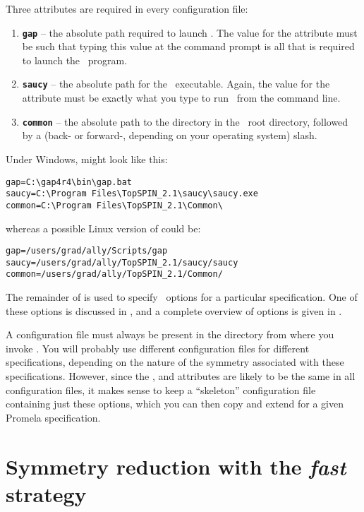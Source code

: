 \noindent Three attributes are required in every configuration file:

\vspace{2mm}
\begin{enumerate}
\item {\bf \texttt{gap}} -- the absolute path required to launch \gap.  The value for
the  attribute must be such that typing this value at
the command prompt is all that is required to launch the \gap\
program.
\item {\bf \texttt{saucy}}  -- the absolute path for the \saucy\ executable.  Again, the
value for the \inline{saucy} attribute must be exactly what you type
to run \saucy\ from the command line.
\item {\bf \texttt{common}} -- the absolute path to the  directory in
the \topspin\ root directory, followed by a (back- or forward-,
depending on your operating system) slash.
\end{enumerate}
%
Under Windows,  might look like this:
%
\begin{lstlisting}
gap=C:\gap4r4\bin\gap.bat
saucy=C:\Program Files\TopSPIN_2.1\saucy\saucy.exe
common=C:\Program Files\TopSPIN_2.1\Common\
\end{lstlisting}
%
whereas a possible Linux version of  could be:
%
\begin{lstlisting}
gap=/users/grad/ally/Scripts/gap
saucy=/users/grad/ally/TopSPIN_2.1/saucy/saucy
common=/users/grad/ally/TopSPIN_2.1/Common/
\end{lstlisting}
%
The remainder of  is used to specify \topspin\
options for a particular specification.  One of these options is
discussed in , and a complete overview of
options is given in \chapref{overview}.

A configuration file must always be present in the directory from
where you invoke \topspin.  You will probably use different
configuration files for different specifications, depending on the
nature of the symmetry associated with these specifications.
However, since the \inline{gap}, \inline{saucy} and 
attributes are likely to be the same in all configuration files, it
makes sense to keep a ``skeleton'' configuration file containing
just these options, which you can then copy and extend for a given
Promela specification.

\section{Symmetry reduction with the \emph{fast} strategy}\label{sec:example:fast}

